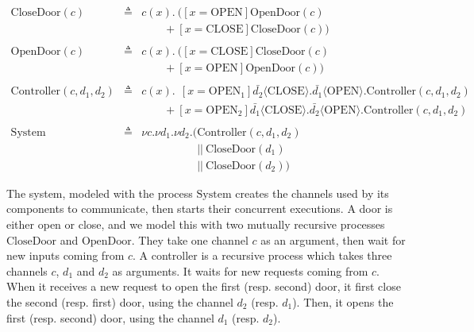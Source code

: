 \begin{example}
  \[
    \begin{array}{rcl}
      \mathrm{CloseDoor}(c)
      & \triangleq
      & c(x) . \ ([x = \mathrm{OPEN}] \mathrm{OpenDoor}(c) \\
      &
      & \qquad + [x = \mathrm{CLOSE}] \mathrm{CloseDoor}(c)) \\
      & & \\
      \mathrm{OpenDoor}(c)
      & \triangleq
      & c(x) . \ ([x = \mathrm{CLOSE}] \mathrm{CloseDoor}(c) \\
      &
      & \qquad + [x = \mathrm{OPEN}] \mathrm{OpenDoor}(c)) \\
      & & \\
      \mathrm{Controller}(c, d_1, d_2)
      & \triangleq
      & c(x). \ \ [x = \mathrm{OPEN}_1] \bar{d_2} \langle
        \mathrm{CLOSE} \rangle . \bar{d_1} \langle \mathrm{OPEN} \rangle . \mathrm{Controller}(c, d_1, d_2) \\
      &
      & \qquad + [x = \mathrm{OPEN}_2] \bar{d_1} \langle
        \mathrm{CLOSE} \rangle . \bar{d_2} \langle \mathrm{OPEN} \rangle. \mathrm{Controller}(c, d_1, d_2) \\
      & & \\
      \mathrm{System}
      & \triangleq
      & \nu c. \nu d_1. \nu d_2. (\mathrm{Controller}(c, d_1, d_2) \\
      &
      & \quad\qquad\qquad ||\ \mathrm{CloseDoor}(d_1) \\
      &
      & \quad\qquad\qquad ||\ \mathrm{CloseDoor}(d_2))
    \end{array}
  \]

  The system, modeled with the process \( \mathrm{System} \) creates the
  channels used by its components to communicate, then starts their concurrent
  executions.
  A door is either open or close, and we model this with two mutually recursive
  processes \( \mathrm{CloseDoor} \) and \( \mathrm{OpenDoor} \).
  They take one channel \( c \) as an argument, then wait for new inputs coming
  from \( c \).
  A controller is a recursive process which takes three channels \( c \),
  \( d_1 \) and \( d_2 \) as arguments.
  It waits for new requests coming from \( c \).
  When it receives a new request to open the first (resp. second) door, it first
  close the second (resp. first) door, using the channel \( d_2 \) (resp.
  \( d_1 \)).
  Then, it opens the first (resp. second) door, using the channel \( d_1 \)
  (resp. \( d_2 \)).
\end{example}

